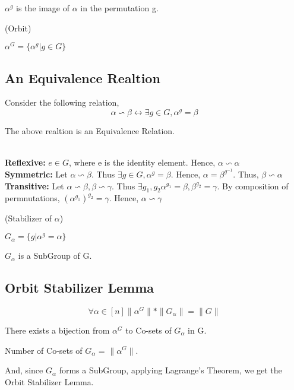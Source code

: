\begin{note} $\alpha^g$ is the image of $\alpha$ in the permutation g. \end{note}

\begin{definition}(Orbit)
\begin{center}
$\alpha^G = \{\alpha^g | g \in G\}$
\end{center}
\end{definition}

\subsection{An Equivalence Realtion}
Consider the following relation,
\[\alpha \backsim \beta \leftrightarrow \exists g \in G, \alpha^g = \beta\]

\begin{claim}
The above realtion is an Equivalence Relation. 
\end{claim}
\\
\textbf{Reflexive:} $e \in G$, where e is the identity element. Hence, $\alpha \backsim \alpha$ \\
\textbf{Symmetric:} Let $\alpha \backsim \beta$. Thus $\exists g \in G, \alpha^g = \beta$. Hence, $\alpha = \beta^{g^{-1}}$. Thus, $\beta \backsim \alpha$ \\
\textbf{Transitive:} Let $\alpha \backsim \beta, \beta \backsim \gamma$. Thus $\exists g_1, g_2 \alpha^{g_1} = \beta, \beta^{g_2} = \gamma$. By composition of permnutations, $(\alpha^{g_1})^{g_2} = \gamma$. Hence, $\alpha \backsim \gamma$


\begin{definition}(Stabilizer of $\alpha$)
\begin{center}
$G_{\alpha} = \{g | \alpha^g = \alpha\}$
\end{center}
\end{definition}

\begin{observation}
$G_{\alpha}$ is a SubGroup of G.
\end{observation}

\subsection{Orbit Stabilizer Lemma}
\[\forall \alpha \in [n] \|\alpha^G\|*\|G_{\alpha}\| = \|G\| \]
\begin{claim}
There exists a bijection from $\alpha^G$ to Co-sets of $G_{\alpha}$ in G.
\end{claim}
\begin{corollary}
Number of Co-sets of $G_{\alpha}$ = $\|\alpha^G\|$.
\end{corollary}
And, since $G_{\alpha}$ forms a SubGroup, applying Lagrange's Theorem, we get the Orbit Stabilizer Lemma.

